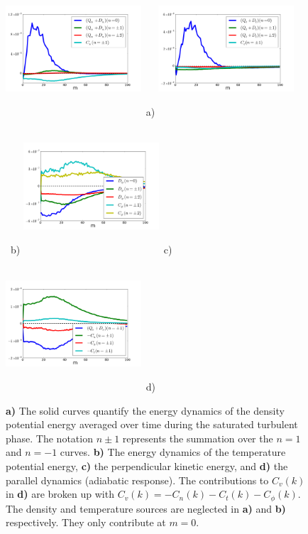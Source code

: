 \documentclass[12pt]{article}
\begin{document}
\begin{figure}
\includegraphics[width=0.45\textwidth,height=50mm]{density_dynamics}~a)
\hfil
\includegraphics[width=0.45\textwidth,height=50mm]{temperature_dynamics}~b)
\hfil
\includegraphics[width=0.45\textwidth,height=50mm]{potential_dynamics}~c)
\hfil
\includegraphics[width=0.45\textwidth,height=50mm]{parallel_dynamics}~d)
\hfil
\caption{\textbf{a)} The solid curves quantify the energy dynamics of the density potential energy averaged over time during the saturated turbulent phase. The notation $n \pm 1$ represents the
summation over the $n=1$ and $n=-1$ curves. \textbf{b)} The energy dynamics of the temperature potential energy, \textbf{c)} the perpendicular kinetic energy, and \textbf{d)} the parallel
dynamics (adiabatic response). The contributions to $C_v(k)$ in \textbf{d)} are broken up with $C_v(k) = -C_n(k) - C_t(k) - C_\phi(k)$. 
The density and temperature sources are neglected in \textbf{a)} and \textbf{b)} respectively. They only contribute at $m=0$.}
\label{nc_dynamics_figures}
\end{figure}
\end{document}
